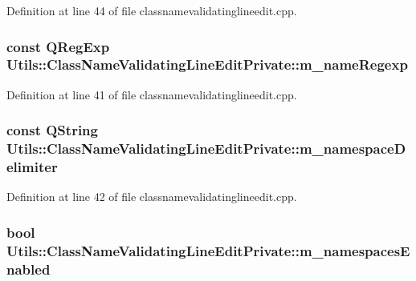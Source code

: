 Definition at line 44 of file classnamevalidatinglineedit.\-cpp.

\hypertarget{struct_utils_1_1_class_name_validating_line_edit_private_a3b1964b13bc15a3ae11f83e12942fd99}{
\subsubsection[{m\-\_\-name\-Regexp}]{\setlength{\rightskip}{0pt plus 5cm}const Q\-Reg\-Exp Utils\-::\-Class\-Name\-Validating\-Line\-Edit\-Private\-::m\-\_\-name\-Regexp}}\label{struct_utils_1_1_class_name_validating_line_edit_private_a3b1964b13bc15a3ae11f83e12942fd99}


Definition at line 41 of file classnamevalidatinglineedit.\-cpp.

\hypertarget{struct_utils_1_1_class_name_validating_line_edit_private_a83c2d2b3c70dd5300a1bc57e518ed3d5}{
\subsubsection[{m\-\_\-namespace\-Delimiter}]{\setlength{\rightskip}{0pt plus 5cm}const {\bf Q\-String} Utils\-::\-Class\-Name\-Validating\-Line\-Edit\-Private\-::m\-\_\-namespace\-Delimiter}}\label{struct_utils_1_1_class_name_validating_line_edit_private_a83c2d2b3c70dd5300a1bc57e518ed3d5}


Definition at line 42 of file classnamevalidatinglineedit.\-cpp.

\hypertarget{struct_utils_1_1_class_name_validating_line_edit_private_aac53edaa6749894e449523e8d60c5ec1}{
\subsubsection[{m\-\_\-namespaces\-Enabled}]{\setlength{\rightskip}{0pt plus 5cm}bool Utils\-::\-Class\-Name\-Validating\-Line\-Edit\-Private\-::m\-\_\-namespaces\-Enabled}}\label{struct_utils_1_1_class_name_validating_line_edit_private_aac53edaa6749894e449523e8d60c5ec1}


